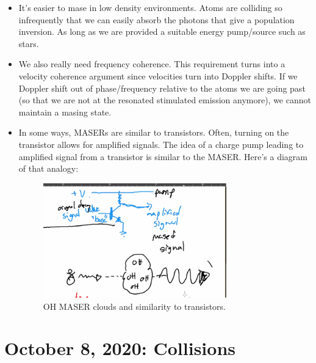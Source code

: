 \documentclass{article}
\begin{document}
\begin{itemize}
    \item It's easier to mase in low density environments. Atoms are colliding so infrequently that we can easily absorb the photons that give a population inversion. As long as we are provided a suitable energy pump/source such as stars.
    
    \item We also really need frequency coherence. This requirement turns into a velocity coherence argument since velocities turn into Doppler shifts. If we Doppler shift out of phase/frequency relative to the atoms we are going past (so that we are not at the resonated stimulated emission anymore), we cannot maintain a masing state. 
    
    \item In some ways, MASERs are similar to transistors. Often, turning on the transistor allows for amplified signals. The idea of a charge pump leading to amplified signal from a transistor is similar to the MASER. Here's a diagram of that analogy:
    
    \begin{figure}
        \centering
        \includegraphics[width=0.75\textwidth]{figures/Screen Shot 2020-10-06 at 12.32.31 PM.png}
        \caption{OH MASER clouds and similarity to transistors. }
        \label{fig:transistor}
    \end{figure}
\end{itemize}




\newpage
\section{October 8, 2020: Collisions}
\end{document}
